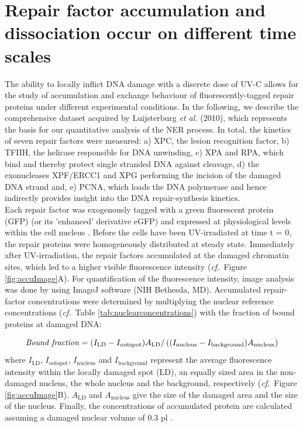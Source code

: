 \section{Repair factor accumulation and dissociation occur on different time scales}
\label{subsec:AccuFlipExp}
The ability to locally inflict DNA damage with a discrete dose of UV-C allows for the study of accumulation and exchange behaviour of fluorescently-tagged repair proteins under different experimental conditions. In the following, we describe the comprehensive dataset acquired by Luijsterburg \textit{et al.} (2010)\cite{Luijsterburg2010}, which represents the basis for our quantitative analysis of the NER process. In total, the kinetics of seven repair factors were measured: a) XPC, the lesion recognition factor, b) TFIIH, the helicase responsible for DNA unwinding, c) XPA and RPA, which bind and thereby protect single stranded DNA against cleavage, d) the exonucleases XPF/ERCC1 and XPG performing the incision of the damaged DNA strand and, e) PCNA, which loads the DNA polymerase and hence indirectly provides insight into the DNA repair-synthesis kinetics. \\
\label{sec:eGFP}
Each repair factor was exogenously tagged with a green fluorescent protein (GFP) (or its 'enhanced' derivative eGFP) and expressed at physiological levels within the cell nucleus \cite{Houtsmuller1999,Hoogstraten2002,Rademakers2003,Essers2005,Zotter2006}. Before the cells have been UV-irradiated at time t = 0, the repair proteins were homogeneously distributed at steady state. Immediately after UV-irradiation, the repair factors accumulated at the damaged chromatin sites, which led to a higher visible fluorescence intensity (\textit{cf.}\ Figure \ref{fig:accuImage}A). For quantification of the fluorescence intensity, image analysis was done by using ImageJ software (NIH Bethesda, MD). Accumulated repair-factor concentrations were determined by multiplying the nuclear reference concentrations (\textit{cf.}\ Table \ref{tab:nuclearconcentrations}) with the fraction of bound proteins at damaged DNA:

\begin{equation}
\text{\textit{Bound fraction}} = (I_\text{LD} - I_\text{outspot})A_\text{LD}/ \left((I_\text{nucleus} - I_\text{background})A_\text{nucleus}\right)
\label{Eqn:BoundFraction}
\end{equation}     
where $I_\text{LD}$, $I_\text{outspot}$, $I_\text{nucleus}$ and $I_\text{background}$ represent the average fluorescence intensity within the locally damaged spot (LD), an equally sized area in the non-damaged nucleus, the whole nucleus and the background, respectively (\textit{cf.}\ Figure \ref{fig:accuImage}B). $A_\text{LD}$ and $A_\text{nucleus}$ give the size of the damaged area and the size of the nucleus. Finally, the concentrations of accumulated protein are calculated assuming a damaged nuclear volume of 0.3 pl \cite{Luijsterburg2010}.\\    

